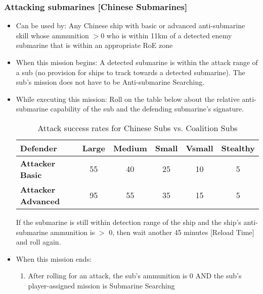 \documentclass{article}
\begin{document}
    \subsubsection{Attacking submarines [Chinese Submarines]}
        \begin{itemize}
            \item{Can be used by:} Any Chinese ship with basic or advanced anti-submarine skill whose ammunition $>0$ who is within 11km of a detected enemy submarine that is within an appropriate RoE zone
            \item{When this mission begins:} A detected submarine is within the attack range of a sub (no provision for ships to track towards a detected submarine). The sub's mission does not have to be Anti-submarine Searching.
            \item{While executing this mission:} Roll on the table below about the relative anti-submarine capability of the sub and the defending submarine's signature.
                \begin{table}[h!]
                    \centering
                    \begin{tabular}{lccccc}
                        \toprule
                        \textbf{Defender} & \textbf{Large} & \textbf{Medium} & \textbf{Small} & \textbf{Vsmall} & \textbf{Stealthy} \\
                        \midrule
                        \textbf{Attacker Basic}    & 55 & 40 & 25 & 10 & 5 \\
                        \textbf{Attacker Advanced} & 95 & 55 & 35 & 15 & 5 \\
                        \bottomrule
                    \end{tabular}
                    \caption{Attack success rates for Chinese Subs vs. Coalition Subs}
                    \label{tab:ChineseSubmarinesVs.CoalitionSubmarines}
                \end{table}
                If the submarine is still within detection range of the ship and the ship's anti-submarine ammunition is $>$ 0, then wait another 45 minutes [Reload Time] and roll again.
            \item{When this mission ends:}
                \begin{enumerate}[label=\arabic*)]
                    \item After rolling for an attack, the sub's ammunition is 0 AND the sub's player-assigned mission is Submarine Searching \par

\end{enumerate}
\end{itemize}
\end{document}
